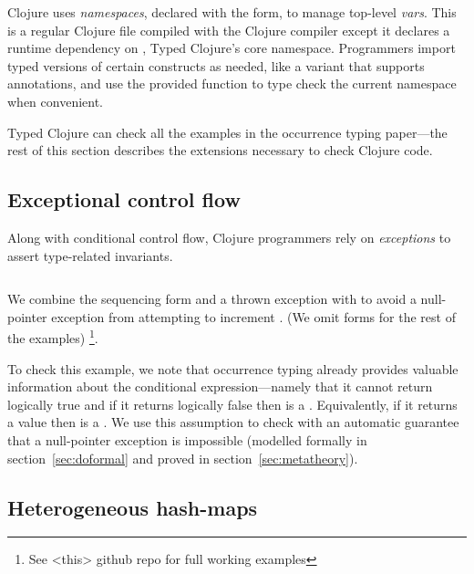 \begin{exmp}
\inputminted[firstline=1]{clojure}{code/demo/src/demo/eg1.clj}
\label{example:conditionalflow}
\end{exmp}

Clojure uses \emph{namespaces}, declared with the
 form, to manage top-level \emph{vars}.
This is a regular Clojure file compiled with
the Clojure compiler except it declares a runtime dependency on
, Typed Clojure's core namespace.
Programmers import typed versions of certain constructs as needed, like
a  variant that supports annotations,
and use the provided  function to type check the current namespace
when convenient.

Typed Clojure can check all the examples in the occurrence typing
paper---the rest of this section describes the extensions necessary
to check Clojure code.

\subsection{Exceptional control flow}

Along with conditional control flow,
Clojure programmers rely on \emph{exceptions}
to assert type-related invariants.

\begin{exmp}
\inputminted[firstline=13,lastline=15]{clojure}{code/demo/src/demo/do.clj}
\label{example:doexception}
\end{exmp}

We combine the sequencing form  and a thrown exception with
 to avoid a null-pointer exception from attempting to increment .
(We omit  forms for the rest of the examples)
\footnote{See <this> github repo for full working examples}.

To check this example, we note that
occurrence typing already provides
valuable information about the conditional expression---namely that it cannot return logically true and if it returns logically false 
then  is a . Equivalently, if it returns a value then  is a .
We use this assumption to check  with an automatic
guarantee that a null-pointer exception is impossible
(modelled formally in section~\ref{sec:doformal} and proved
in section~\ref{sec:metatheory}).

\subsection{Heterogeneous hash-maps}


